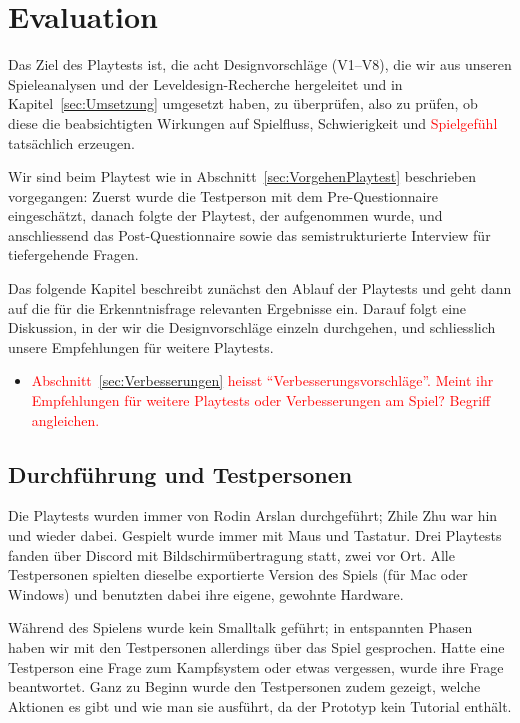 \documentclass[../Main.tex]{subfiles}
\begin{document}
\section{Evaluation} \label{sec:Evaluation}

Das Ziel des Playtests ist, die acht Designvorschläge (V1--V8), die wir aus unseren Spieleanalysen und der Leveldesign-Recherche hergeleitet und in Kapitel~\ref{sec:Umsetzung} umgesetzt haben, zu überprüfen, also zu prüfen, ob diese die beabsichtigten Wirkungen auf Spielfluss, Schwierigkeit und \textcolor{red}{Spielgefühl} tatsächlich erzeugen.

Wir sind beim Playtest wie in Abschnitt~\ref{sec:VorgehenPlaytest} beschrieben vorgegangen: Zuerst wurde die Testperson mit dem Pre-Questionnaire eingeschätzt, danach folgte der Playtest, der aufgenommen wurde, und anschliessend das Post-Questionnaire sowie das semistrukturierte Interview für tiefergehende Fragen.

Das folgende Kapitel beschreibt zunächst den Ablauf der Playtests und geht dann auf die für die Erkenntnisfrage relevanten Ergebnisse ein. Darauf folgt eine Diskussion, in der wir die Designvorschläge einzeln durchgehen, und schliesslich unsere Empfehlungen für weitere Playtests.

\begin{itemize}[leftmargin=1.5cm]
    \item \textcolor{red}{Abschnitt~\ref{sec:Verbesserungen} heisst \enquote{Verbesserungsvorschläge}. Meint ihr Empfehlungen für weitere Playtests oder Verbesserungen am Spiel? Begriff angleichen.}
\end{itemize}

\subsection{Durchführung und Testpersonen} \label{sec:Durchfuehrung}

Die Playtests wurden immer von Rodin Arslan durchgeführt; Zhile Zhu war hin und wieder dabei. Gespielt wurde immer mit Maus und Tastatur. Drei Playtests fanden über Discord mit Bildschirmübertragung statt, zwei vor Ort. Alle Testpersonen spielten dieselbe exportierte Version des Spiels (für Mac oder Windows) und benutzten dabei ihre eigene, gewohnte Hardware.

Während des Spielens wurde kein Smalltalk geführt; in entspannten Phasen haben wir mit den Testpersonen allerdings über das Spiel gesprochen. Hatte eine Testperson eine Frage zum Kampfsystem oder etwas vergessen, wurde ihre Frage beantwortet. Ganz zu Beginn wurde den Testpersonen zudem gezeigt, welche Aktionen es gibt und wie man sie ausführt, da der Prototyp kein Tutorial enthält.
\end{document}

